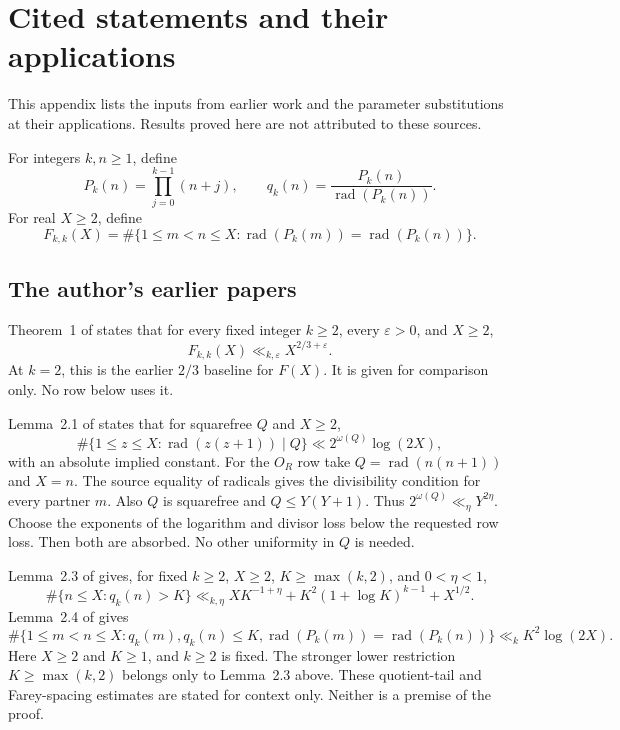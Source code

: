 \section{Cited statements and their applications}\label{app:sources}

This appendix lists the inputs from earlier work and the
parameter substitutions at their applications. Results proved here are not
attributed to these sources.

For integers \(k,n\ge1\), define
\[
 P_k(n)=\prod_{j=0}^{k-1}(n+j),\qquad
 q_k(n)=\frac{P_k(n)}{\operatorname{rad}(P_k(n))}.
\]
For real \(X\ge2\), define
\[
 F_{k,k}(X)=\#\{1\le m<n\le X:
     \operatorname{rad}(P_k(m))=\operatorname{rad}(P_k(n))\}.
\]

\subsection*{The author's earlier papers}

Theorem~1 of \cite{Paper1} states that for every fixed integer \(k\ge2\), every
\(\varepsilon>0\), and \(X\ge2\),
\[
 F_{k,k}(X)\ll_{k,\varepsilon}X^{2/3+\varepsilon}.
\]
At \(k=2\), this is the earlier \(2/3\) baseline for \(F(X)\). It is
given for comparison only. No row below uses it.

Lemma~2.1 of \cite{Paper1} states that for squarefree \(Q\) and \(X\ge2\),
\[
 \#\{1\le z\le X:\operatorname{rad}(z(z+1))\mid Q\}
 \ll 2^{\omega(Q)}\log(2X),
\]
with an absolute implied constant. For the \(O_R\) row take
\(Q=\operatorname{rad}(n(n+1))\) and \(X=n\). The source equality of
radicals gives the divisibility condition for every partner \(m\).
Also \(Q\) is squarefree and \(Q\le Y(Y+1)\). Thus
\(2^{\omega(Q)}\ll_\eta Y^{2\eta}\). Choose the exponents of the
logarithm and divisor loss below the requested row loss. Then both are
absorbed. No other uniformity in \(Q\) is needed.

Lemma~2.3 of \cite{Paper1} gives, for fixed \(k\ge2\), \(X\ge2\),
\(K\ge\max(k,2)\), and \(0<\eta<1\),
\[
 \#\{n\le X:q_k(n)>K\}
 \ll_{k,\eta} XK^{-1+\eta}
      +K^2(1+\log K)^{k-1}+X^{1/2}.
\]
Lemma~2.4 of \cite{Paper1} gives
\[
 \#\{1\le m<n\le X:q_k(m),q_k(n)\le K,
       \operatorname{rad}(P_k(m))=\operatorname{rad}(P_k(n))\}
 \ll_k K^2\log(2X).
\]
Here $X\ge2$ and $K\ge1$, and $k\ge2$ is fixed. The stronger lower
restriction $K\ge\max(k,2)$ belongs only to Lemma~2.3 above.
These quotient-tail and Farey-spacing estimates are stated for context
only. Neither is a premise of the proof.

